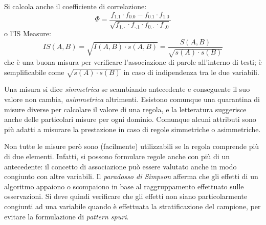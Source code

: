 \documentclass[11pt, a4page, twocolumn]{article}
\begin{document}
Si calcola anche il coefficiente di correlazione:
\begin{equation*}
  \Phi = \frac{f_{1.1} \cdot f_{0.0} - f_{0.1} \cdot f_{1.0}}{\sqrt{f_{1.\cdot} \cdot f_{\cdot.1} \cdot f_{0.\cdot} \cdot f_{\cdot.0}}}
\end{equation*}
o l'IS Measure:
\begin{equation*}
  IS(A, B) = \sqrt{I(A, B) \cdot s(A, B)} = \frac{S(A, B)}{\sqrt{s(A) \cdot s(B)}}
\end{equation*}
che è una buona misura per verificare l'associazione di parole all'interno di testi; è semplificabile come $\sqrt{s(A) \cdot s(B)}$ in caso di indipendenza tra le due variabili.

Una misura si dice \textit{simmetrica} se scambiando antecedente e conseguente il suo valore non cambia, \textit{asimmetrica} altrimenti.
Esistono comunque una quarantina di misure diverse per calcolare il valore di una regola, e la letteratura suggerisce anche delle particolari misure per ogni dominio.
Comunque alcuni attributi sono più adatti a misurare la prestazione in caso di regole simmetriche o asimmetriche. \newline

Non tutte le misure però sono (facilmente) utilizzabili se la regola comprende più di due elementi.
Infatti, si possono formulare regole anche con più di un antecedente: il concetto di associazione può essere valutato anche in modo congiunto con altre variabili.
Il \textit{paradosso di Simpson} afferma che gli effetti di un algoritmo appaiono o scompaiono in base al raggruppamento effettuato sulle osservazioni.
Si deve quindi verificare che gli effetti non siano particolarmente congiunti ad una variabile quando è effettuata la stratificazione del campione, per evitare la formulazione di \textit{pattern spuri}.
\end{document}
